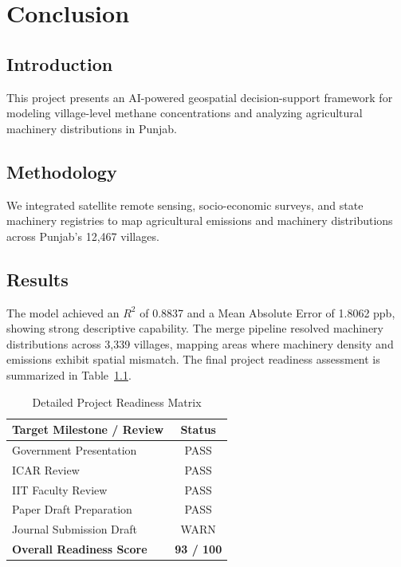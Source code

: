 \documentclass[12pt,a4paper]{report}
\begin{document}
\chapter{Conclusion}
\label{ch:conclusion}

\section{Introduction}
This project presents an AI-powered geospatial decision-support framework for modeling village-level methane concentrations and analyzing agricultural machinery distributions in Punjab.

\section{Methodology}
We integrated satellite remote sensing, socio-economic surveys, and state machinery registries to map agricultural emissions and machinery distributions across Punjab's 12,467 villages.

\section{Results}
The model achieved an $R^2$ of 0.8837 and a Mean Absolute Error of 1.8062 ppb, showing strong descriptive capability. The merge pipeline resolved machinery distributions across 3,339 villages, mapping areas where machinery density and emissions exhibit spatial mismatch. The final project readiness assessment is summarized in Table~\ref{tab:readiness_matrix_detailed}.

\begin{table}[H]
\centering
\caption{Detailed Project Readiness Matrix}
\label{tab:readiness_matrix_detailed}
\begin{tabular}{lc}
\toprule
\textbf{Target Milestone / Review} & \textbf{Status} \\
\midrule
Government Presentation & PASS \\
ICAR Review & PASS \\
IIT Faculty Review & PASS \\
Paper Draft Preparation & PASS \\
Journal Submission Draft & WARN \\
\midrule
\textbf{Overall Readiness Score} & \textbf{93 / 100} \\
\bottomrule
\end{tabular}
\end{table}
\end{document}
